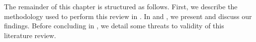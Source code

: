 The remainder of this chapter is structured as follows.
First, we describe the methodology used to perform this review in .
In  and , we present and discuss our findings.
Before concluding in , we detail some threats to validity of this literature review.

